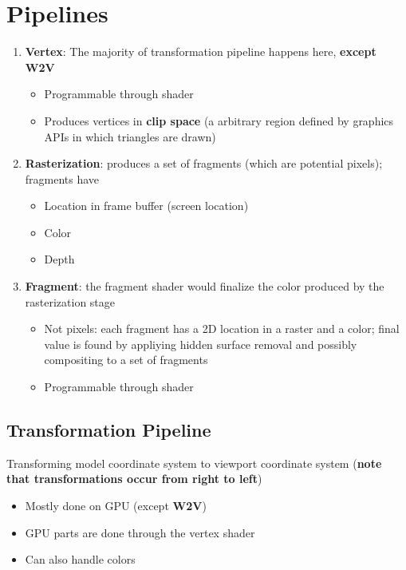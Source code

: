\chapter{Pipelines}\label{chapter: pipelines}

\begin{enumerate}
  \item \textbf{Vertex}: The majority of transformation pipeline happens here,
  \textbf{except W2V}
  \begin{itemize}
    \item Programmable through shader
    \item Produces vertices in \textbf{clip space} (a arbitrary region defined
    by graphics APIs in which triangles are drawn)
  \end{itemize}

  \item \textbf{Rasterization}: produces a set of fragments (which are
  potential pixels); fragments have
  \begin{itemize}
    \item Location in frame buffer (screen location)
    \item Color
    \item Depth
  \end{itemize}

  \item \textbf{Fragment}: the fragment shader would finalize the color
  produced by the rasterization stage
  \begin{itemize}
    \item Not pixels: each fragment has a 2D location in a raster and a color;
    final value is found by appliying hidden surface removal and possibly
    compositing to a set of fragments
    \item Programmable through shader
  \end{itemize}
\end{enumerate}

\section{Transformation Pipeline}

  Transforming model coordinate system to viewport coordinate system
  (\textbf{note that transformations occur from right to left})

  \begin{itemize}
    \item Mostly done on GPU (except \textbf{W2V})
    \item GPU parts are done through the vertex shader
    \item Can also handle colors
  \end{itemize}

